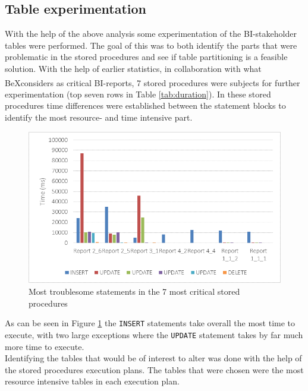 \documentclass{cslthse-msc}
\newcommand{\bex}{BeX\textsuperscript{\textregistered}}
\begin{document}
\subsection{Table experimentation} \label{Experiments}
With the help of the above analysis some experimentation of the BI-stakeholder tables were performed. The goal of this was to both identify the parts that were problematic in the stored procedures and see if table partitioning is a feasible solution.
With the help of earlier statistics, in collaboration with what \bex considers as critical BI-reports, 7 stored procedures were subjects for further experimentation (top seven rows in Table \ref{tab:duration}). In these stored procedures time differences were established between the statement blocks to identify the most resource- and time intensive part. 
\begin{figure}[H]
\begin{center}
\includegraphics[scale=1]{Pictures/blocks.png}
\caption{Most troublesome statements in the 7 most critical stored procedures}
\label{time graph}
\end{center}
\end{figure}
\noindent As can be seen in Figure \ref{time graph} the \texttt{INSERT} statements take overall the most time to execute, with two large exceptions where the \texttt{UPDATE} statement takes by far much more time to execute.\\ Identifying the tables that would be of interest to alter was done with the help of the stored procedures execution plans. The tables that were chosen were the most resource intensive tables in each execution plan. 
\end{document}
